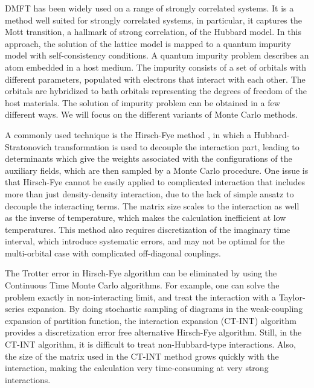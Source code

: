 

DMFT has been widely used on a range of strongly correlated systems. 
It is a method well suited for strongly correlated systems, in particular, it 
captures the Mott transition, a hallmark of strong correlation, of the Hubbard 
model. In this approach, the solution of the lattice model is mapped to a 
quantum impurity model with self-consistency conditions. 
A quantum impurity problem describes an atom embedded in a host medium. 
The impurity consists of a set of orbitals with different parameters, populated
with electrons that interact with each other. The orbitals are hybridized to 
bath orbitals representing the degrees of freedom of the host materials. 
The solution of impurity problem can be obtained in a few different ways. 
We will focus on the different variants of Monte Carlo methods.

A commonly used technique is the Hirsch-Fye method \cite{1986PhRvL..56.2521H}, in which a 
Hubbard-Stratonovich transformation is used to decouple the interaction part,
leading to determinants which give the weights associated with the 
configurations of the auxiliary fields, which are then sampled by a Monte Carlo 
procedure. One issue is that Hirsch-Fye cannot be easily applied to complicated
interaction that includes more than just density-density interaction, due to the
lack of simple ansatz to decouple the interacting terms. 
The matrix size scales to the interaction as well as the inverse of 
temperature, which makes the calculation inefficient at low temperatures.
This method also requires discretization of the imaginary time interval,
which introduce systematic errors, and may not be optimal for the multi-orbital 
case with complicated off-diagonal couplings.

The Trotter error in Hirsch-Fye algorithm can be eliminated by using the 
Continuous Time Monte Carlo algorithms. For example, one can solve the problem 
exactly in non-interacting limit, and treat the interaction with a Taylor-series
 expansion. By doing stochastic sampling of diagrams in the weak-coupling 
expansion of partition function, the interaction expansion (CT-INT) algorithm
\cite{2005PhRvB..72c5122R}
provides a discretization error free alternative Hirsch-Fye algorithm.
Still, in the CT-INT algorithm, it is difficult to treat non-Hubbard-type 
interactions. Also, the size of the matrix used in the CT-INT method grows
quickly with the interaction, making the calculation very time-consuming at 
very strong interactions.


